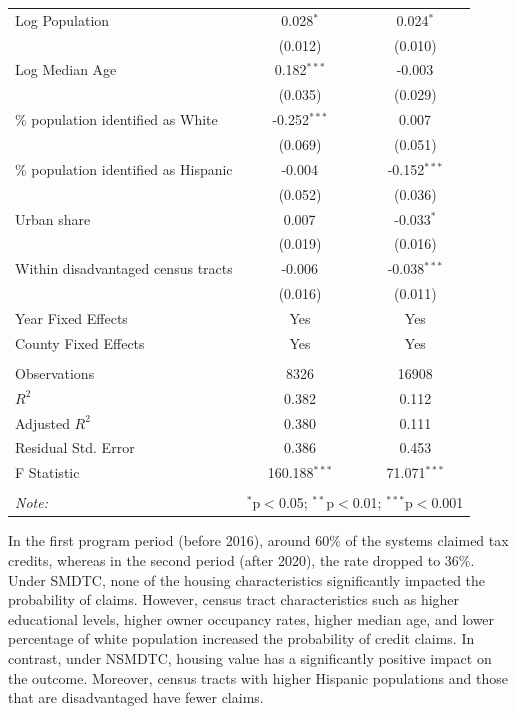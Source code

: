 \documentclass[12pt,twoside,letterpaper]{article}
\begin{document}
\begin{table}[!ht]
{\begin{tabular}{@{\extracolsep{5pt}}lcc}
 Log Population & 0.028$^{*}$ & 0.024$^{*}$ \\
& (0.012) & (0.010) \\
 Log Median Age & 0.182$^{***}$ & -0.003$^{}$ \\
& (0.035) & (0.029) \\
 \% population identified as White & -0.252$^{***}$ & 0.007$^{}$ \\
& (0.069) & (0.051) \\
 \% population identified as Hispanic & -0.004$^{}$ & -0.152$^{***}$ \\
& (0.052) & (0.036) \\
 Urban share & 0.007$^{}$ & -0.033$^{*}$ \\
& (0.019) & (0.016) \\
 Within disadvantaged census tracts & -0.006$^{}$ & -0.038$^{***}$ \\
& (0.016) & (0.011) \\
 Year Fixed Effects & Yes & Yes \\
 County Fixed Effects & Yes & Yes \\
\hline \\[-1.8ex]
 Observations & 8326 & 16908 \\
 $R^2$ & 0.382 & 0.112 \\
 Adjusted $R^2$ & 0.380 & 0.111 \\
 Residual Std. Error & 0.386 & 0.453 \\
 F Statistic & 160.188$^{***}$ & 71.071$^{***}$ \\
\hline
\hline \\[-1.8ex]
\textit{Note:} & \multicolumn{2}{r}{$^{*}$p$<$0.05; $^{**}$p$<$0.01; $^{***}$p$<$0.001} \\
\end{tabular}}
\end{table}

In the first program period (before 2016), around 60\% of the systems claimed tax credits, whereas in the second period (after 2020), the rate dropped to 36\%. Under SMDTC, none of the housing characteristics significantly impacted the probability of claims. However, census tract characteristics such as higher educational levels, higher owner occupancy rates, higher median age, and lower percentage of white population increased the probability of credit claims. In contrast, under NSMDTC, housing value has a significantly positive impact on the outcome. Moreover, census tracts with higher Hispanic populations and those that are disadvantaged have fewer claims.
\end{document}
